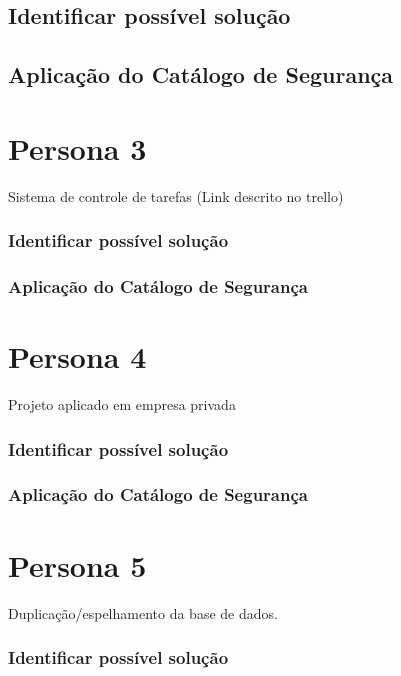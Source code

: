 \subsection{Identificar possível solução}

\subsection{Aplicação do Catálogo de Segurança}

\section{Persona 3}
\label{subsec:persona3}

Sistema de controle de tarefas (Link descrito no trello)

\subsubsection{Identificar possível solução}

\subsubsection{Aplicação do Catálogo de Segurança}

\section{Persona 4}
\label{subsec:persona4}

Projeto aplicado em empresa privada

\subsubsection{Identificar possível solução}

\subsubsection{Aplicação do Catálogo de Segurança}

\section{Persona 5}
\label{subsec:persona5}

Duplicação/espelhamento da base de dados. 

\subsubsection{Identificar possível solução}

